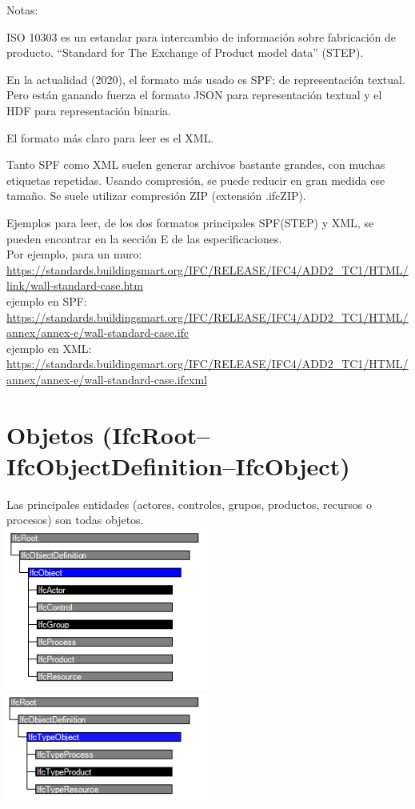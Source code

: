 \documentclass[spanish,12pt,a4paper,final,oneside]{book}
\begin{document}
Notas:

ISO 10303 es un estandar para intercambio de información sobre fabricación de producto. ``Standard for The Exchange of Product model data'' (STEP).

En la actualidad (2020), el formato más usado es SPF; de representación textual. Pero están ganando fuerza el formato JSON para representación textual y el HDF para representación binaria.

El formato más claro para leer es el XML.

Tanto SPF como XML suelen generar archivos bastante grandes, con muchas etiquetas repetidas. Usando compresión, se puede reducir en gran medida ese tamaño. Se suele utilizar compresión ZIP (extensión .ifcZIP).

Ejemplos para leer, de los dos formatos principales SPF(STEP) y XML, se pueden encontrar en la sección E de las especificaciones.
\\Por ejemplo, para un muro:
\\ \url{https://standards.buildingsmart.org/IFC/RELEASE/IFC4/ADD2_TC1/HTML/link/wall-standard-case.htm}
\\ejemplo en SPF: \url{https://standards.buildingsmart.org/IFC/RELEASE/IFC4/ADD2_TC1/HTML/annex/annex-e/wall-standard-case.ifc}
\\ejemplo en XML: \url{https://standards.buildingsmart.org/IFC/RELEASE/IFC4/ADD2_TC1/HTML/annex/annex-e/wall-standard-case.ifcxml} 

\section{Objetos (IfcRoot--IfcObjectDefinition--IfcObject)}
Las principales entidades (actores, controles, grupos, productos, recursos o procesos) son todas objetos.
\\ \includegraphics[width=0.5\textwidth]{jerarquia de IfcObject}
\includegraphics[width=0.5\textwidth]{jerarquia de IfcTypeObject}
\end{document}

